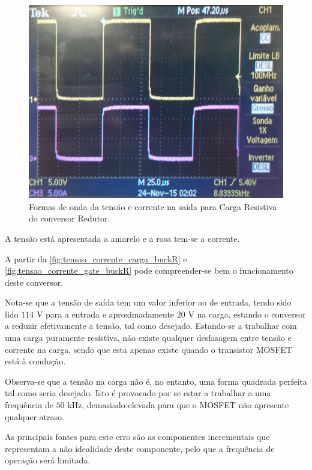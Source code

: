 \documentclass[a4paper,11pt]{article}
\numberwithin{equation}{section}
\begin{document}
\begin{figure}[h]
	\centering
	\includegraphics[keepaspectratio=true, scale=0.13]{img/figs/tensao_corrente_carga_buckR}
	\caption{Formas de onda da tensão e corrente na saída para Carga Resistiva do conversor Redutor.}
	\label{fig:tensao_corrente_carga_buckR}
	\vspace{-0.8em}
\end{figure} 

A tensão está apresentada a amarelo e a rosa tem-se a corrente.

A partir da \autoref{fig:tensao_corrente_carga_buckR} e \autoref{fig:tensao_corrente_gate_buckR} pode compreender-se bem o funcionamento deste conversor.

Nota-se que a tensão de saída tem um valor inferior ao de entrada, tendo sido lido $114$ V para a entrada e aproximadamente $20$ V na carga, estando o conversor a reduzir efetivamente a tensão, tal como desejado. Estando-se a trabalhar com uma carga puramente resistiva, não existe qualquer desfasagem entre tensão e corrente na carga, sendo que esta apenas existe quando o transistor MOSFET está à condução.

Observa-se que a tensão na carga não é, no entanto, uma forma quadrada perfeita tal como seria desejado. Isto é provocado por se estar a trabalhar a uma frequência de $50$ kHz, demasiado elevada para que o MOSFET não apresente qualquer atraso. 

As principais fontes para este erro são as componentes incrementais que representam a não idealidade deste componente, pelo que a frequência de operação será limitada.
\end{document}
